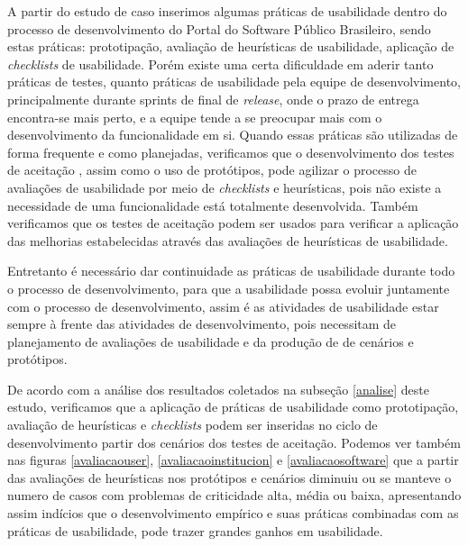 A partir do estudo de caso inserimos algumas práticas de usabilidade dentro do processo de desenvolvimento do Portal do Software Público Brasileiro, sendo estas práticas: prototipação, avaliação de heurísticas de usabilidade, aplicação de \textit{checklists} de usabilidade. Porém existe uma certa dificuldade em aderir tanto práticas de testes, quanto práticas de usabilidade pela equipe de desenvolvimento, principalmente durante sprints de final de \textit{release}, onde o prazo de entrega encontra-se mais perto, e a equipe tende a se preocupar mais com o desenvolvimento  da funcionalidade em si. Quando essas práticas são utilizadas de forma frequente e como planejadas, verificamos que o desenvolvimento dos testes de aceitação , assim como o uso de protótipos, pode agilizar o processo de avaliações de usabilidade por meio de \textit{checklists} e heurísticas, pois não existe a necessidade de uma funcionalidade está totalmente desenvolvida. Também verificamos que os testes de aceitação podem ser usados para verificar a aplicação das melhorias estabelecidas através das avaliações de heurísticas de usabilidade. 

Entretanto é necessário dar continuidade as práticas de usabilidade durante todo o processo de desenvolvimento, para que a usabilidade possa evoluir juntamente com o processo de desenvolvimento, assim é as atividades de usabilidade estar sempre à frente das atividades de desenvolvimento, pois necessitam de planejamento de avaliações de usabilidade e da produção de de cenários e protótipos.




De acordo com a análise dos resultados coletados na subseção \ref{analise} deste estudo, verificamos que a aplicação de práticas de usabilidade como prototipação, avaliação de heurísticas e \textit{checklists} podem ser inseridas no ciclo de desenvolvimento partir dos cenários dos testes de aceitação. Podemos ver também nas figuras \ref{avaliacaouser}, \ref{avaliacaoinstitucion} e \ref{avaliacaosoftware} que a partir das avaliações de heurísticas nos protótipos e cenários diminuiu ou se manteve o numero de casos com problemas de criticidade alta, média ou baixa, apresentando assim indícios que o desenvolvimento empírico e suas práticas combinadas com as práticas de usabilidade, pode trazer grandes ganhos em usabilidade.


